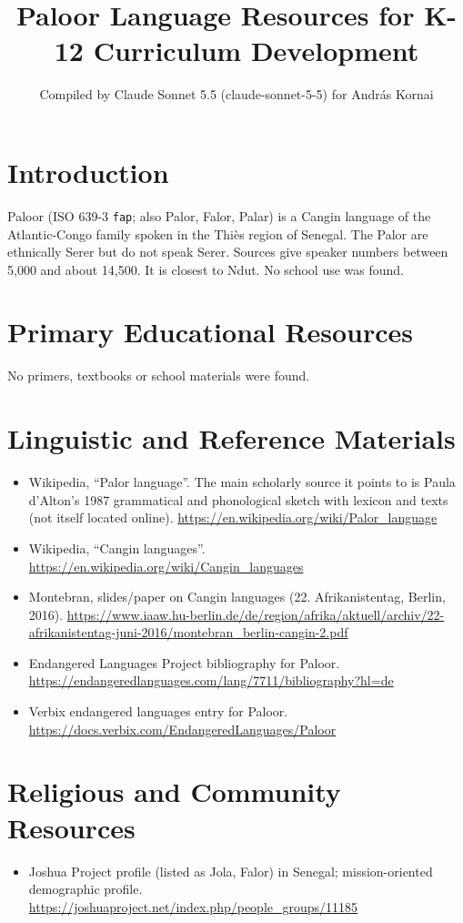 \documentclass[12pt]{article}
\title{Paloor Language Resources for K-12 Curriculum Development}
\author{Compiled by Claude Sonnet 5.5 (claude-sonnet-5-5) for Andr\'as Kornai}
\date{}
\begin{document}
\maketitle

\section{Introduction}
Paloor (ISO 639-3 \texttt{fap}; also Palor, Falor, Palar) is a Cangin language of the Atlantic-Congo family spoken in the Thi\`es region of Senegal. The Palor are ethnically Serer but do not speak Serer. Sources give speaker numbers between 5,000 and about 14,500. It is closest to Ndut. No school use was found.

\section{Primary Educational Resources}
No primers, textbooks or school materials were found.

\section{Linguistic and Reference Materials}
\begin{itemize}
\item Wikipedia, ``Palor language''. The main scholarly source it points to is Paula d'Alton's 1987 grammatical and phonological sketch with lexicon and texts (not itself located online). \url{https://en.wikipedia.org/wiki/Palor_language}
\item Wikipedia, ``Cangin languages''. \url{https://en.wikipedia.org/wiki/Cangin_languages}
\item Montebran, slides/paper on Cangin languages (22. Afrikanistentag, Berlin, 2016). \url{https://www.iaaw.hu-berlin.de/de/region/afrika/aktuell/archiv/22-afrikanistentag-juni-2016/montebran_berlin-cangin-2.pdf}
\item Endangered Languages Project bibliography for Paloor. \url{https://endangeredlanguages.com/lang/7711/bibliography?hl=de}
\item Verbix endangered languages entry for Paloor. \url{https://docs.verbix.com/EndangeredLanguages/Paloor}
\end{itemize}

\section{Religious and Community Resources}
\begin{itemize}
\item Joshua Project profile (listed as Jola, Falor) in Senegal; mission-oriented demographic profile. \url{https://joshuaproject.net/index.php/people_groups/11185}
\end{itemize}
\end{document}
